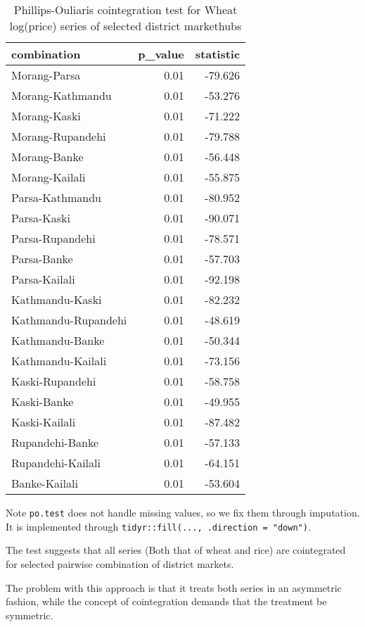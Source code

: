 \documentclass[12pt,]{article}
\begin{document}
\begin{longtable}[t]{lrr}
\caption{\label{tab:pairwise-phillips-cointegration}Phillips-Ouliaris cointegration test for Wheat log(price) series of selected district markethubs}\\
\toprule
combination & p\_value & statistic\\
\midrule
Morang-Parsa & 0.01 & -79.626\\
Morang-Kathmandu & 0.01 & -53.276\\
Morang-Kaski & 0.01 & -71.222\\
Morang-Rupandehi & 0.01 & -79.788\\
Morang-Banke & 0.01 & -56.448\\
\addlinespace
Morang-Kailali & 0.01 & -55.875\\
Parsa-Kathmandu & 0.01 & -80.952\\
Parsa-Kaski & 0.01 & -90.071\\
Parsa-Rupandehi & 0.01 & -78.571\\
Parsa-Banke & 0.01 & -57.703\\
\addlinespace
Parsa-Kailali & 0.01 & -92.198\\
Kathmandu-Kaski & 0.01 & -82.232\\
Kathmandu-Rupandehi & 0.01 & -48.619\\
Kathmandu-Banke & 0.01 & -50.344\\
Kathmandu-Kailali & 0.01 & -73.156\\
\addlinespace
Kaski-Rupandehi & 0.01 & -58.758\\
Kaski-Banke & 0.01 & -49.955\\
Kaski-Kailali & 0.01 & -87.482\\
Rupandehi-Banke & 0.01 & -57.133\\
Rupandehi-Kailali & 0.01 & -64.151\\
\addlinespace
Banke-Kailali & 0.01 & -53.604\\
\bottomrule
\end{longtable}

Note \texttt{po.test} does not handle missing values, so we fix them through imputation. It is implemented through \texttt{tidyr::fill(...,\ .direction\ =\ "down")}.

The test suggests that all series (Both that of wheat and rice) are cointegrated for selected pairwise combination of district markets.

The problem with this approach is that it treats both series in an asymmetric fashion, while the concept of cointegration demands that the treatment be symmetric.
\end{document}
